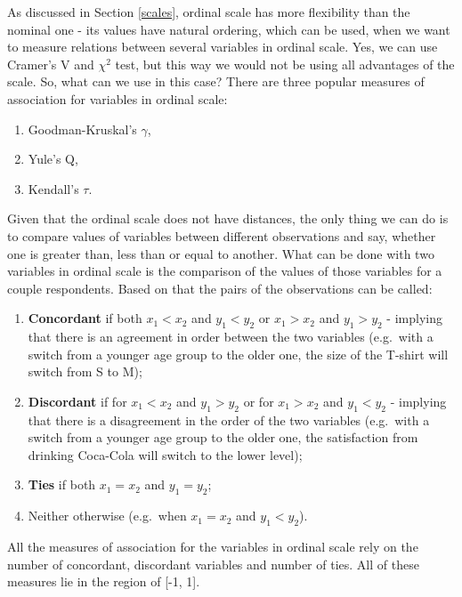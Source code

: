 \documentclass[
]{book}
\providecommand{\tightlist}{%
  \setlength{\itemsep}{0pt}\setlength{\parskip}{0pt}}
\theoremstyle{definition}
\theoremstyle{definition}
\theoremstyle{definition}
\theoremstyle{definition}
\theoremstyle{remark}
\begin{document}
As discussed in Section \ref{scales}, ordinal scale has more flexibility than the nominal one - its values have natural ordering, which can be used, when we want to measure relations between several variables in ordinal scale. Yes, we can use Cramer's V and \(\chi^2\) test, but this way we would not be using all advantages of the scale. So, what can we use in this case? There are three popular measures of association for variables in ordinal scale:

\begin{enumerate}
\def\labelenumi{\arabic{enumi}.}
\tightlist
\item
  Goodman-Kruskal's \(\gamma\),
\item
  Yule's Q,
\item
  Kendall's \(\tau\).
\end{enumerate}

Given that the ordinal scale does not have distances, the only thing we can do is to compare values of variables between different observations and say, whether one is greater than, less than or equal to another. What can be done with two variables in ordinal scale is the comparison of the values of those variables for a couple respondents. Based on that the pairs of the observations can be called:

\begin{enumerate}
\def\labelenumi{\arabic{enumi}.}
\tightlist
\item
  \textbf{Concordant} if both \(x_1 < x_2\) and \(y_1 < y_2\) or \(x_1 > x_2\) and \(y_1 > y_2\) - implying that there is an agreement in order between the two variables (e.g.~with a switch from a younger age group to the older one, the size of the T-shirt will switch from S to M);
\item
  \textbf{Discordant} if for \(x_1 < x_2\) and \(y_1 > y_2\) or for \(x_1 > x_2\) and \(y_1 < y_2\) - implying that there is a disagreement in the order of the two variables (e.g.~with a switch from a younger age group to the older one, the satisfaction from drinking Coca-Cola will switch to the lower level);
\item
  \textbf{Ties} if both \(x_1 = x_2\) and \(y_1 = y_2\);
\item
  Neither otherwise (e.g.~when \(x_1 = x_2\) and \(y_1 < y_2\)).
\end{enumerate}

All the measures of association for the variables in ordinal scale rely on the number of concordant, discordant variables and number of ties. All of these measures lie in the region of {[}-1, 1{]}.
\end{document}
